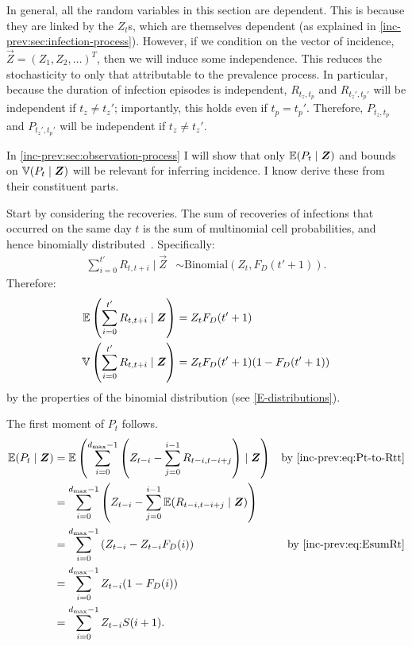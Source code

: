 \documentclass[thesis.tex]{subfiles}
\begin{document}
In general, all the random variables in this section are dependent.
This is because they are linked by the $Z_t$s, which are themselves dependent (as explained in \cref{inc-prev:sec:infection-process}).
However, if we condition on the vector of incidence, $\vec{Z} = (Z_1, Z_2, \dots)^T$, then we will induce some independence.
This reduces the stochasticity to only that attributable to the prevalence process.
In particular, because the duration of infection episodes is independent, $R_{t_z,t_p}$ and $R_{t_z',t_p'}$ will be independent if $t_z \neq t_z'$; importantly, this holds even if $t_p = t_p'$.
Therefore, $P_{t_z,t_p}$ and $P_{t_z',t_p'}$ will be independent if $t_z \neq t_z'$.

In \cref{inc-prev:sec:observation-process} I will show that only $\operatorname{\mathbb{E}}(P_t \mid \bm{Z})$ and bounds on $\operatorname{\mathbb{V}}(P_t \mid \bm{Z})$ will be relevant for inferring incidence.
I know derive these from their constituent parts.

Start by considering the recoveries.
The sum of recoveries of infections that occurred on the same day $t$ is the sum of multinomial cell probabilities, and hence binomially distributed~\autocite{alamAnalysis}.
Specifically:
\begin{align}
  \sum_{i=0}^{t'} R_{t,t+i} \mid \vec{Z} &\sim \text{Binomial}(Z_t, F_D(t'+1)). \label{inc-prev:eq:binomialRt}
\end{align}
Therefore:
\begin{align}
  \operatorname{\mathbb{E}} \left( \sum_{i=0}^{t'} R_{t,t+i} \mid \bm{Z} \right) &= Z_t F_D(t'+1) \label{inc-prev:eq:EsumRt} \\
  \operatorname{\mathbb{V}} \left( \sum_{i=0}^{t'} R_{t,t+i} \mid \bm{Z} \right) &= Z_t F_D(t'+1) (1 - F_D(t'+1)) \label{inc-prev:eq:VsumRt}
\end{align}
by the properties of the binomial distribution (see \cref{E-distributions}).

The first moment of $P_t$ follows.
\begin{align}
\E(P_t \mid \vec{Z})
  &= \E\left(\sum_{i=0}^{d_\text{max}-1} \left( Z_{t-i} - \sum_{j=0}^{i-1} R_{t-i,t-i+j} \right) \mid \vec{Z} \right) &\text{by \cref{inc-prev:eq:Pt-to-Rtt}}\\
  &= \sum_{i=0}^{d_\text{max}-1} \left( Z_{t-i} - \sum_{j=0}^{i-1} \E( R_{t-i,t-i+j} \mid \vec{Z}) \right) \\
  &= \sum_{i=0}^{d_\text{max}-1} \left( Z_{t-i} - Z_{t-i} F_D(i) \right) &\text{by \cref{inc-prev:eq:EsumRt}}\\
  &= \sum_{i=0}^{d_\text{max}-1} Z_{t-i} (1 - F_D(i)) \\
  &= \sum_{i=0}^{d_\text{max}-1} Z_{t-i} S(i+1) \label{inc-prev:eq:EPt}.
\end{align}
\end{document}

